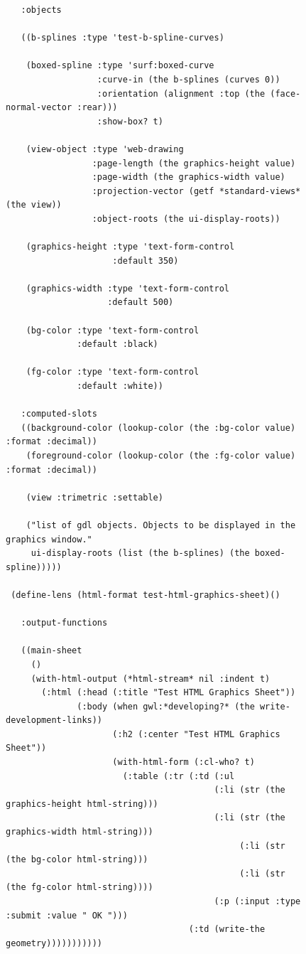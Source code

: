 \documentclass [11pt]{book}
\begin{document}
\begin{itemize}
\begin{figure}
\begin{lrbox}{\boxedverb}
\begin{minipage}{\linewidth}
{\begin{verbatim}
   :objects 

   ((b-splines :type 'test-b-spline-curves)
   
    (boxed-spline :type 'surf:boxed-curve
                  :curve-in (the b-splines (curves 0))
                  :orientation (alignment :top (the (face-normal-vector :rear)))
                  :show-box? t)

    (view-object :type 'web-drawing
                 :page-length (the graphics-height value)
                 :page-width (the graphics-width value)
                 :projection-vector (getf *standard-views* (the view))
                 :object-roots (the ui-display-roots))
   
    (graphics-height :type 'text-form-control
                     :default 350)
   
    (graphics-width :type 'text-form-control
                    :default 500)
   
    (bg-color :type 'text-form-control
              :default :black)
   
    (fg-color :type 'text-form-control
              :default :white))
     
   :computed-slots
   ((background-color (lookup-color (the :bg-color value) :format :decimal))
    (foreground-color (lookup-color (the :fg-color value) :format :decimal))
     
    (view :trimetric :settable)
   
    ("list of gdl objects. Objects to be displayed in the graphics window."
     ui-display-roots (list (the b-splines) (the boxed-spline)))))

 (define-lens (html-format test-html-graphics-sheet)()
   
   :output-functions

   ((main-sheet
     ()
     (with-html-output (*html-stream* nil :indent t)
       (:html (:head (:title "Test HTML Graphics Sheet"))
              (:body (when gwl:*developing?* (the write-development-links))
                     (:h2 (:center "Test HTML Graphics Sheet"))
                     (with-html-form (:cl-who? t)
                       (:table (:tr (:td (:ul 
                                         (:li (str (the graphics-height html-string)))
                                         (:li (str (the graphics-width html-string)))
                                              (:li (str (the bg-color html-string)))
                                              (:li (str (the fg-color html-string))))
                                         (:p (:input :type :submit :value " OK ")))
                                    (:td (write-the geometry)))))))))))


\end{verbatim}}
\end{minipage}
\end{lrbox}
\end{figure}
\end{itemize}
\end{document}
